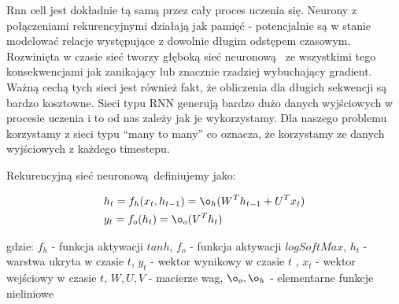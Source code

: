 Rnn cell jest dokładnie tą samą przez cały proces
uczenia się. Neurony z połączeniami rekurencyjnymi działają jak pamięć - potencjalnie są w stanie modelować relacje
występujące z dowolnie długim odstępem czasowym. 
Rozwinięta w czasie sieć tworzy głęboką sieć neuronową 
ze wszystkimi tego konsekwencjami jak zanikający lub znacznie rzadziej wybuchający gradient. 
Ważną cechą tych sieci jest również fakt, że obliczenia dla długich sekwencji są bardzo kosztowne.
Sieci typu RNN generują bardzo dużo danych wyjściowych w procesie uczenia i to od nas zależy jak je 
wykorzystamy. Dla naszego problemu korzystamy z sieci typu ``many to many'' co oznacza, że korzystamy
ze danych wyjściowych z każdego timestepu.

\newpage
Rekurencyjną sieć neuronową definiujemy jako:

\begin{align}
  &h_t = f_h(x_t, h_{t-1}) = \o_h(W^Th_{t-1} + U^Tx_t) \\ 
  &y_t = f_o(h_t) = \o_o(V^Th_t)
\end{align}

gdzie: \newline
$f_h$ - funkcja aktywacji $tanh$, \newline
$f_o$ - funkcja aktywacji $logSoftMax$, \newline
$h_t$ - warstwa ukryta w czasie $t$, \newline
$y_t$ - wektor wynikowy w czasie $t$ , \newline
$x_t$ - wektor wejściowy w czasie $t$, \newline
$W, U, V$ - macierze wag, \newline
$\o_o, \o_h$ - elementarne funkcje nieliniowe \newline


